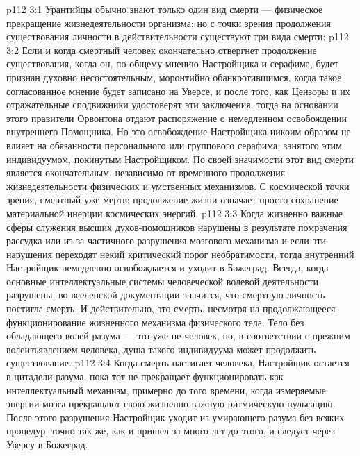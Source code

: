 \vs p112 3:1 Урантийцы обычно знают только один вид смерти --- физическое прекращение жизнедеятельности организма; но с точки зрения продолжения существования личности в действительности существуют три вида смерти:
\vs p112 3:2 \bibnobreakspace {} Если и когда смертный человек окончательно отвергнет продолжение существования, когда он, по общему мнению Настройщика и серафима, будет признан духовно несостоятельным, моронтийно обанкротившимся, когда такое согласованное мнение будет записано на Уверсе, и после того, как Цензоры и их отражательные сподвижники удостоверят эти заключения, тогда на основании этого правители Орвонтона отдают распоряжение о немедленном освобождении внутреннего Помощника. Но это освобождение Настройщика никоим образом не влияет на обязанности персонального или группового серафима, занятого этим индивидуумом, покинутым Настройщиком. По своей значимости этот вид смерти является окончательным, независимо от временного продолжения жизнедеятельности физических и умственных механизмов. С космической точки зрения, смертный уже мертв; продолжение жизни означает просто сохранение материальной инерции космических энергий.
\vs p112 3:3 \pc {}\bibnobreakspace {} Когда жизненно важные сферы служения высших духов\hyp{}помощников нарушены в результате помрачения рассудка или из\hyp{}за частичного разрушения мозгового механизма и если эти нарушения переходят некий критический порог необратимости, тогда внутренний Настройщик немедленно освобождается и уходит в Божеград. Всегда, когда основные интеллектуальные системы человеческой волевой деятельности разрушены, во вселенской документации значится, что смертную личность постигла смерть. И действительно, это смерть, несмотря на продолжающееся функционирование жизненного механизма физического тела. Тело без обладающего волей разума --- это уже не человек, но, в соответствии с прежним волеизъявлением человека, душа такого индивидуума может продолжить существование.
\vs p112 3:4 \pc {}\bibnobreakspace {} Когда смерть настигает человека, Настройщик остается в цитадели разума, пока тот не прекращает функционировать как интеллектуальный механизм, примерно до того времени, когда измеряемые энергии мозга прекращают свою жизненно важную ритмическую пульсацию. После этого разрушения Настройщик уходит из умирающего разума без всяких процедур, точно так же, как и пришел за много лет до этого, и следует через Уверсу в Божеград.
